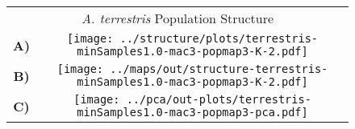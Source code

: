 \documentclass[border=10pt,varwidth=30cm]{standalone}
\begin{document}
\begin{figure}
\begin{tabular}[t]{cc}
    \multicolumn{2}{c}{\Large \textit{A. terrestris} Population Structure} \\
  {\textbf{\large A)}} & \texttt{[image: ../structure/plots/terrestris-minSamples1.0-mac3-popmap3-K-2.pdf]} \\ \vspace{1mm}
  {\textbf{\large B)}} & \texttt{[image: ../maps/out/structure-terrestris-minSamples1.0-mac3-popmap3-K-2.pdf]} \\
  {\textbf{\large C)}} & \texttt{[image: ../pca/out-plots/terrestris-minSamples1.0-mac3-popmap3-pca.pdf]} \\
\end{tabular}
\end{figure}
\end{document}
